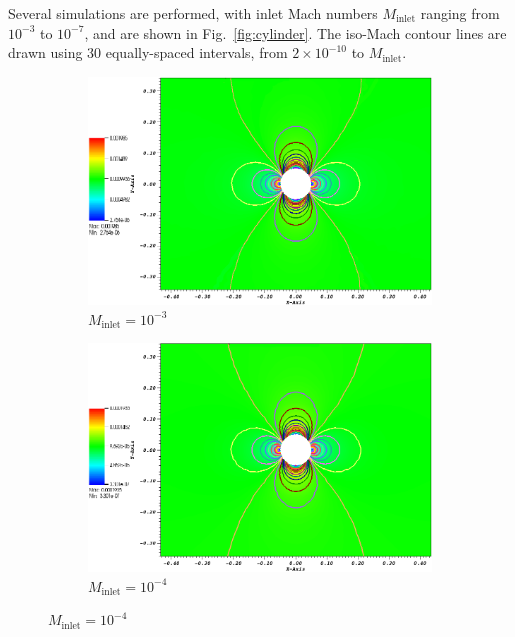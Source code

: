 \documentclass[preprint,10pt]{elsarticle}
\newcommand{\fig}[1]{Fig.~\ref{#1}}                      %
\begin{document}
Several simulations are performed, with inlet Mach numbers $M_{\text{inlet}}$ ranging from $10^{-3}$ to $10^{-7}$, 
and are shown in \fig{fig:cylinder}. The iso-Mach contour lines are drawn using 30 equally-spaced intervals, from 
$2\times 10^{-10}$ to $M_{\text{inlet}}$.
%
\begin{figure}[H]
        \centering
        \begin{subfigure}[b]{0.495\textwidth}
                \centering
                \includegraphics[width=\textwidth]{CylinderMach1em3ZoomIn.png}
                \caption{$M_{\text{inlet}}=10^{-3}$}
                \label{fig:cyl_1em3}
        \end{subfigure}%

        \begin{subfigure}[b]{0.495\textwidth}
                \centering
                \includegraphics[width=\textwidth]{CylinderMach1em4ZoomIn.png}
                \caption{$M_{\text{inlet}}=10^{-4}$}
                \label{fig:cyl_1em4}
        \end{subfigure}    


\end{figure}
\end{document}
